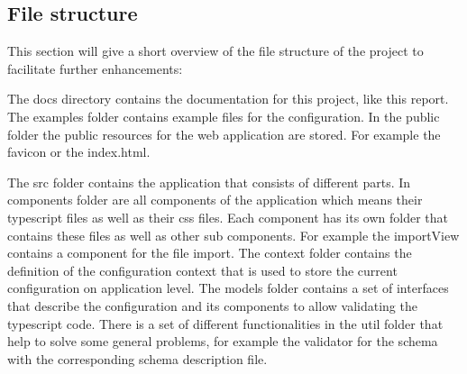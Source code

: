 \newpage

\subsection{File structure}
This section will give a short overview of the file structure of the project to facilitate further enhancements:

\hfill

The docs directory contains the documentation for this project, like this report. The examples folder contains example files for the configuration. In the public folder the public resources for the web application are stored. For example the favicon or the index.html.

The src folder contains the application that consists of different parts. In components folder are all components of the application which means their typescript files as well as their css files. Each component has its own folder that contains these files as well as other sub components. For example the importView contains a component for the file import. The context folder contains the definition of the configuration context that is used to store the current configuration on application level. The models folder contains a set of interfaces that describe the configuration and its components to allow validating the typescript code. There is a set of different functionalities in the util folder that help to solve some general problems, for example the validator for the schema with the corresponding schema description file.

\clearpage